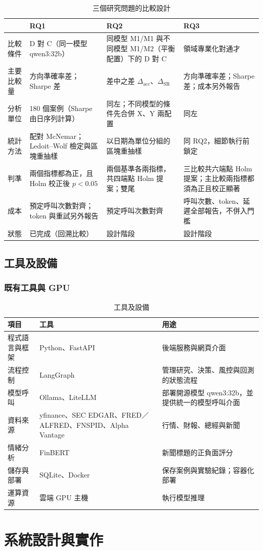 \documentclass[12pt,a4paper]{article}
\numberwithin{table}{section}
\numberwithin{figure}{section}
\begin{document}
\begin{table}[H]\centering\small
\caption{三個研究問題的比較設計}
\label{tab:rqcompare}
\begin{tabularx}{\textwidth}{@{}L{.13} Y Y Y@{}}\toprule
 & RQ1 & RQ2 & RQ3 \\\midrule
比較條件 & D 對 C（同一模型 qwen3:32b） & 同模型 M1/M1 與不同模型 M1/M2（平衡配置）下的 D 對 C & 領域專業化對通才 \\
主要比較量 & 方向準確率差；Sharpe 差 & 差中之差 $\Delta_{\mathrm{acc}}$、$\Delta_{\mathrm{SR}}$ & 方向準確率差；Sharpe 差；成本另外報告 \\
分析單位 & 180 個案例（Sharpe 由日序列計算） & 同左；不同模型的條件先合併 X、Y 兩配置 & 同左 \\
統計方法 & 配對 McNemar；Ledoit--Wolf 檢定與區塊重抽樣 & 以日期為單位分組的區塊重抽樣 & 同 RQ2，細節執行前鎖定 \\
判準 & 兩個指標都為正，且 Holm 校正後 $p<0.05$ & 兩個基準各兩指標，共四端點 Holm 提案；雙尾 & 三比較共六端點 Holm 提案；主比較兩指標都須為正且校正顯著 \\
成本 & 預定呼叫次數對齊；token 與重試另外報告 & 預定呼叫次數對齊 & 呼叫次數、token、延遲全部報告，不併入門檻 \\
狀態 & 已完成（回溯比較） & 設計階段 & 設計階段 \\
\bottomrule\end{tabularx}\end{table}

\subsection{工具及設備}

\subsubsection{既有工具與 GPU}
\begin{table}[H]
\centering\small
\caption{工具及設備}
\label{tab:tools}
\begin{tabularx}{\textwidth}{@{}L{.17} Y Y@{}}
\toprule
項目 & 工具 & 用途 \\
\midrule
程式語言與框架 & Python、FastAPI & 後端服務與網頁介面 \\
流程控制 & LangGraph & 管理研究、決策、風控與回測的狀態流程 \\
模型呼叫 & Ollama、LiteLLM & 部署開源模型 qwen3:32b，並提供統一的模型呼叫介面 \\
資料來源 & yfinance、\allowbreak SEC EDGAR、\allowbreak FRED／ALFRED、\allowbreak FNSPID、\allowbreak Alpha Vantage & 行情、財報、總經與新聞 \\
情緒分析 & FinBERT & 新聞標題的正負面評分 \\
儲存與部署 & SQLite、Docker & 保存案例與實驗紀錄；容器化部署 \\
運算資源 & 雲端 GPU 主機 & 執行模型推理 \\
\bottomrule
\end{tabularx}
\end{table}
\clearpage\section{系統設計與實作}
\end{document}
